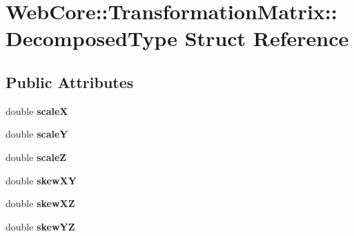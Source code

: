 \hypertarget{struct_web_core_1_1_transformation_matrix_1_1_decomposed_type}{}\section{Web\+Core\+:\+:Transformation\+Matrix\+:\+:Decomposed\+Type Struct Reference}
\label{struct_web_core_1_1_transformation_matrix_1_1_decomposed_type}
\subsection*{Public Attributes}
\begin{DoxyCompactItemize}
\item 
\mbox{\label{struct_web_core_1_1_transformation_matrix_1_1_decomposed_type_ae134ce4226dcc89f3b59ce4a176ab255}} 
double {\bfseries scaleX}
\item 
\mbox{\label{struct_web_core_1_1_transformation_matrix_1_1_decomposed_type_a13f27a5b41150390d395c28060167376}} 
double {\bfseries scaleY}
\item 
\mbox{\label{struct_web_core_1_1_transformation_matrix_1_1_decomposed_type_a98f17ef7b23ce92df7076612ae9fd2ff}} 
double {\bfseries scaleZ}
\item 
\mbox{\label{struct_web_core_1_1_transformation_matrix_1_1_decomposed_type_aef3cb2b330289828ebdf3ef215f9f17a}} 
double {\bfseries skew\+XY}
\item 
\mbox{\label{struct_web_core_1_1_transformation_matrix_1_1_decomposed_type_a8de8268eab7a003a00902f15ba94e05e}} 
double {\bfseries skew\+XZ}
\item 
\mbox{\label{struct_web_core_1_1_transformation_matrix_1_1_decomposed_type_af62b264bc5763968a2167a649a9c8804}} 
double {\bfseries skew\+YZ}
\item 
\mbox{\label{struct_web_core_1_1_transformation_matrix_1_1_decomposed_type_af499841c86336c3bc41e428ff3dabbd6}} 

\end{DoxyCompactItemize}
